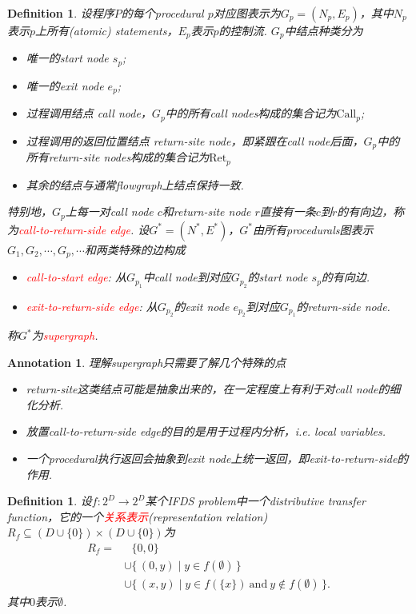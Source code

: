 \documentclass{article}
\newtheorem{definition}[theorem]{Definition}
\newtheorem{annotation}[theorem]{Annotation}
\newcommand*{\xfunc}[4]{{#2}\colon{#3}{#1}{#4}}
\newcommand*{\func}[3]{\xfunc{\to}{#1}{#2}{#3}}
\newcommand\Set[2]{\{\,#1\mid#2\,\}} %
\newcommand{\redt}[1]{\textcolor{red}{#1}}
\begin{document}
\begin{definition}
\rm 设程序$P$的每个procedural $p$对应图表示为$G_p=(N_p, E_p)$，其中$N_p$表示$p$上所有(atomic) statements，$E_p$表示$p$的控制流. $G_p$中结点种类分为
\begin{itemize}
	\item 唯一的start node $s_p$;
	\item 唯一的exit node $e_p$;
	\item 过程调用结点 call node，$G_p$中的所有call nodes构成的集合记为$\text{Call}_p$;
	\item 过程调用的返回位置结点 return-site node，即紧跟在call node后面，$G_p$中的所有return-site nodes构成的集合记为$\text{Ret}_p$
	\item 其余的结点与通常flowgraph上结点保持一致. 
\end{itemize}
特别地，$G_p$上每一对call node $c$和return-site node $r$直接有一条$c$到$r$的有向边，称为\redt{call-to-return-side edge}. 设$G^*=(N^*,E^*)$，$G^*$由所有procedurals图表示$G_1,G_2,\cdots,
G_p,\cdots$和两类特殊的边构成
\begin{itemize}
	\item \redt{call-to-start edge}: 从$G_{p_1}$中call node到对应$G_{p_2}$的start node $s_p$的有向边.
	\item \redt{exit-to-return-side edge}: 从$G_{p_2}$的exit node $e_{p_2}$到对应$G_{p_1}$的return-side node. 
\end{itemize}
称$G^*$为\redt{supergraph}.
\end{definition}


\begin{annotation}
\rm 理解supergraph只需要了解几个特殊的点
\begin{itemize}
	\item return-site这类结点可能是抽象出来的，在一定程度上有利于对call node的细化分析.
	\item 放置call-to-return-side edge的目的是用于过程内分析，i.e. local variables.
	\item 一个procedural执行返回会抽象到exit node上统一返回，即exit-to-return-side的作用.
\end{itemize} 
\end{annotation}

\begin{definition}
\rm 设$\func{f}{2^D}{2^D}$某个IFDS problem中一个distributive transfer function，它的一个\redt{关系表示}(representation relation) $R_f \subseteq (D \cup \{0\}) \times (D \cup \{0\})$为
$$
\begin{aligned}
R_f = &~~~ \{0,0\} \\
&\cup \Set{(0,y)}{y \in f(\emptyset)} \\ 
&\cup  \Set{(x,y)}{y \in f(\{x\})~\text{and}~y \notin f(\emptyset)}.
\end{aligned}
$$
其中$0$表示$\emptyset$. 
\end{definition}
\end{document}
